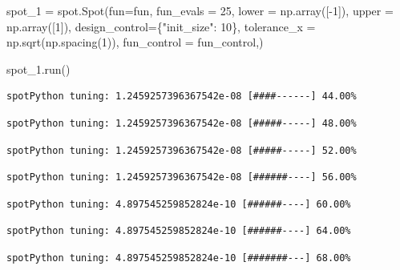 \documentclass[
  letterpaper,
  DIV=11,
  numbers=noendperiod]{scrreprt}
\newenvironment{Shaded}{\begin{snugshade}}{\end{snugshade}}
\newcommand{\DecValTok}[1]{\textcolor[rgb]{0.68,0.00,0.00}{#1}}
\newcommand{\NormalTok}[1]{\textcolor[rgb]{0.00,0.23,0.31}{#1}}
\newcommand{\OperatorTok}[1]{\textcolor[rgb]{0.37,0.37,0.37}{#1}}
\newcommand{\StringTok}[1]{\textcolor[rgb]{0.13,0.47,0.30}{#1}}
\begin{document}
\begin{Shaded}
\begin{Highlighting}[]
\NormalTok{spot\_1 }\OperatorTok{=}\NormalTok{ spot.Spot(fun}\OperatorTok{=}\NormalTok{fun,}
\NormalTok{                   fun\_evals }\OperatorTok{=} \DecValTok{25}\NormalTok{,}
\NormalTok{                   lower }\OperatorTok{=}\NormalTok{ np.array([}\OperatorTok{{-}}\DecValTok{1}\NormalTok{]),}
\NormalTok{                   upper }\OperatorTok{=}\NormalTok{ np.array([}\DecValTok{1}\NormalTok{]),}
\NormalTok{                   design\_control}\OperatorTok{=}\NormalTok{\{}\StringTok{"init\_size"}\NormalTok{: }\DecValTok{10}\NormalTok{\},}
\NormalTok{                   tolerance\_x }\OperatorTok{=}\NormalTok{ np.sqrt(np.spacing(}\DecValTok{1}\NormalTok{)),}
\NormalTok{                   fun\_control }\OperatorTok{=}\NormalTok{ fun\_control,)}

\NormalTok{spot\_1.run()}
\end{Highlighting}
\end{Shaded}

\begin{verbatim}
spotPython tuning: 1.2459257396367542e-08 [####------] 44.00% 
\end{verbatim}

\begin{verbatim}
spotPython tuning: 1.2459257396367542e-08 [#####-----] 48.00% 
\end{verbatim}

\begin{verbatim}
spotPython tuning: 1.2459257396367542e-08 [#####-----] 52.00% 
\end{verbatim}

\begin{verbatim}
spotPython tuning: 1.2459257396367542e-08 [######----] 56.00% 
\end{verbatim}

\begin{verbatim}
spotPython tuning: 4.897545259852824e-10 [######----] 60.00% 
\end{verbatim}

\begin{verbatim}
spotPython tuning: 4.897545259852824e-10 [######----] 64.00% 
\end{verbatim}

\begin{verbatim}
spotPython tuning: 4.897545259852824e-10 [#######---] 68.00% 
\end{verbatim}
\end{document}
